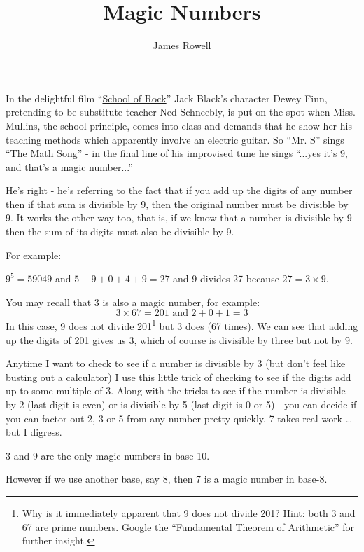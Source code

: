 \documentclass{article}
\title{Magic Numbers}
\author{James Rowell}
\newenvironment{jprIn}{\begin{adjustwidth}{2em}{}}{\end{adjustwidth}}
\begin{document}
\maketitle



In the delightful film ``\href{https://en.wikipedia.org/wiki/School_of_Rock}{School of Rock}'' Jack Black's character Dewey Finn,
pretending to be substitute teacher Ned Schneebly, is put on the spot when
Miss. Mullins, the school principle, comes into class and demands that he show
her his teaching methods which apparently involve an electric guitar.
So ``Mr. S'' sings ``\href{https://www.youtube.com/watch?v=aa8U0nL-KXg}{The Math Song}'' - in the final line of his
improvised tune he sings ``...yes it's 9, and that's a magic number...''

He's right - he's referring to the fact that if you add up the digits of
any number then if that sum is divisible by 9, then the original number
must be divisible by 9. It works the other way too, that is, if we know
that a number is divisible by 9 then the sum of its digits must also be
divisible by 9.

For example:
\begin{jprIn}
$9^5=59049$ and $5+9+0+4+9=27$ and 9 divides 27 because $27 = 3\times{}9$.
\end{jprIn}

You may recall that 3 is also a magic number, for example:
\[ 3\times{}67=201 \text{ and } 2+0+1=3\]
In this case, 9 does not divide 201\footnote{Why is it immediately apparent that 9 does not divide 201? Hint: both 3 and 67 are prime numbers.
Google the ``Fundamental Theorem of Arithmetic'' for further insight.}
but 3 does (67 times).
We can see that adding up the digits of 201 gives us 3, which of course is divisible by three but not by 9.

Anytime I want to check to see if a number is divisible by 3 (but don't feel like busting out a calculator)
I use this little trick of checking to see if the digits add up to some multiple of 3. Along with the tricks to see if the number is divisible by 2 (last digit is even) or is divisible 
by 5 (last digit is 0 or 5) - you can decide if you can factor out 2, 3 or 5 from any number pretty quickly.  7 takes real work \dots{}but I digress.

3 and 9 are the only magic numbers in base-10.

However if we use another
base, say 8, then 7 is a magic number in base-8.
\end{document}

